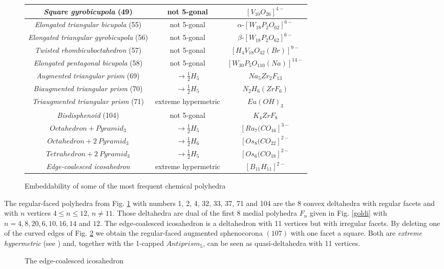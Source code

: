 \begin{figure}[pthb]
\begin{center}
\begin{tabular}{|c|c|c|}
{\em Square gyrobicupola} (49) & not 5-gonal & $[V_{10}O_{26}]^{4-}$ \\ \hline
{\em Elongated triangular bicupola} (55) & not 5-gonal & $\alpha$-$[W_{18}P_2O_{62}]^{6-}$ \\ \hline
{\em Elongated triangular gyrobicupola} (56) & not 5-gonal & $\beta$-$[W_{18}P_2O_{62}]^{6-}$ \\ \hline
{\em Twisted rhombicuboctahedron} (57) & not 5-gonal & $[H_4V_{18}O_{42}(Br)]^{9-}$ \\ \hline
{\em Elongated pentagonal bicupola} (58) & not 5-gonal & $[W_{30}P_5O_{110}(Na)]^{14-}$ \\ \hline
{\em Augmented triangular prism} (69) & $\rightarrow\frac{1}{2}H_{5}$  & $Na_5Zr_2F_{13}$ \\ \hline
{\em Biaugmented triangular prism} (70) & $\rightarrow\frac{1}{2}H_{5}$  & $N_2H_6(ZrF_6)$ \\ \hline
{\em Triaugmented triangular prism} (71) & extreme hypermetric  & $Eu(OH)_3$ \\ \hline
{\it Bisdisphenoid} (104) & not 5-gonal  & $K_4ZrF_8$ \\ \hline
$Octahedron+Pyramid_3$ & $\rightarrow\frac{1}{2}H_{5}$ & $[Ru_7(CO_{16}]^{3-}$ \\ \hline
$Octahedron+2\:Pyramid_3$ & $\rightarrow\frac{1}{2}H_{6}$ & $[Os_8(CO_{22}]^{2-}$ \\ \hline
$Tetrahedron+2\:Pyramid_3$ & $\rightarrow\frac{1}{2}H_{5}$ & $[Os_6(CO_{18}]^{2-}$ \\ \hline
{\it Edge-coalesced icosahedron} & extreme hypermetric & $[B_{11}H_{11}]^{2-}$ \\ \hline
\end{tabular}
\caption{Embeddability of some of the most frequent chemical polyhedra}\label{rfcp}
\end{center}
\end{figure}

\newpage
\begin{remark}\label{bidi}
The regular-faced polyhedra from Fig. \ref{rfcp} with numbers 1, 2, 4, 32, 33, 37, 71 and
104 are the 8 convex deltahedra with regular facets and with $n$ vertices
$4\leq n\leq 12$, $n\neq 11$.
Those deltahedra are dual of the first 8 medial polyhedra $F_n$ given in Fig. \ref{goldi} 
with $n=4,8,20,6,10,16,14$ and $12$.
The edge-coalesced icosahedron is a
deltahedron with 11 vertices but with irregular facets. By deleting one of the curved edges
of Fig. \ref{coalesced} we obtain the regular-faced augmented sphenocorona $(107)$ with one
facet a square. Both are {\it extreme hypermetric} (see \cite{dg93,dl96}) and, together with the 1-capped $Antiprism_5$, 
can be seen as quasi-deltahedra with 11 vertices.

\begin{figure}[bht]
\begin{center}
\caption{The edge-coalesced icosahedron}\label{coalesced}
\end{center}
\end{figure}
\end{remark}


